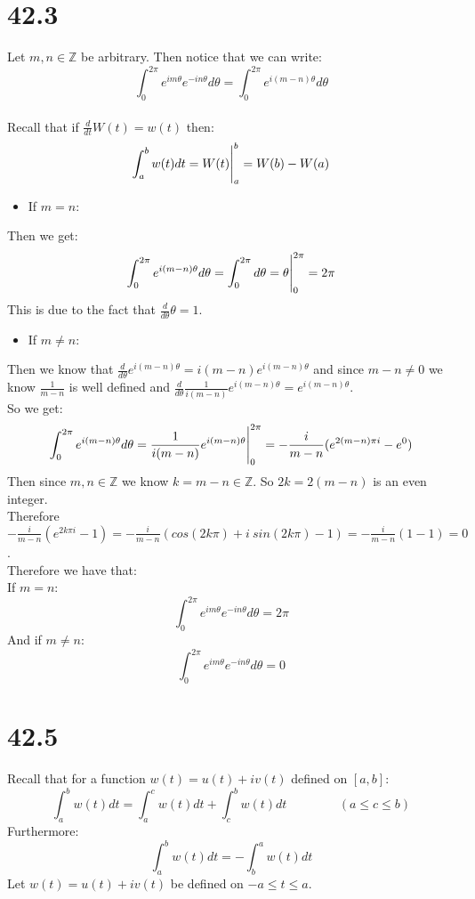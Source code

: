 \documentclass{article}
\begin{document}
\section*{42.3}
\begin{center}
    \doublespacing
    Let $m, n\in\mathbb{Z}$ be arbitrary. Then notice that we can write:
    \[\int _0^{2\pi} e^{im\theta} e^{-in\theta} d\theta =\int _0^{2\pi} e^{i(m-n)\theta} d\theta\]
    \\Recall that if $\frac{d}{dt} W(t) = w(t)$ then:
    \[\int _a^b w(t) dt = W(t)\Bigg{|}_a^b = W(b) - W(a)\]
\end{center}
\begin{itemize}
    \item If $m = n$:
\end{itemize}
\begin{center}
    \doublespacing
    Then we get:
    \[\int _0^{2\pi} e^{i(m-n)\theta} d\theta =\int _0^{2\pi} d\theta =\theta\Bigg{|}_0^{2\pi} = 2\pi\]
    This is due to the fact that $\frac{d}{d\theta}\theta = 1$.
\end{center}
\begin{itemize}
    \item If $m\neq n$:
\end{itemize}
\begin{center}
    \doublespacing
    Then we know that $\frac{d}{d\theta} e^{i(m-n)\theta} = i(m-n) e^{i(m-n)\theta}$ and since $m-n\neq 0$ we know $\frac{1}{m-n}$ is well defined and $\frac{d}{d\theta}\frac{1}{i(m-n)} e^{i(m-n)\theta} = e^{i(m-n)\theta}$.
    \\So we get:
    \[\int _0^{2\pi} e^{i(m-n)\theta} d\theta =\frac{1}{i(m-n)} e^{i(m-n)\theta}\Bigg{|}_0^{2\pi} = -\frac{i}{m-n} (e^{2(m-n)\pi i} - e^0)\]
    Then since $m, n\in\mathbb{Z}$ we know $k = m-n\in\mathbb{Z}$. So $2k = 2(m-n)$ is an even integer.
    \\Therefore $-\frac{i}{m-n} (e^{2k\pi i} - 1) = -\frac{i}{m-n} (cos(2k\pi) + i\:sin(2k\pi) - 1) = -\frac{i}{m-n} (1 - 1) = 0$.
    \break
    \\Therefore we have that:
    \\If $m = n$:
    \[\int _0^{2\pi} e^{im\theta} e^{-in\theta} d\theta = 2\pi\]
    And if $m\neq n$:
    \[\int _0^{2\pi} e^{im\theta} e^{-in\theta} d\theta = 0\]
    \qedsymbol
\end{center}


\newpage
\section*{42.5}
\begin{center}
    \doublespacing
    Recall that for a function $w(t) = u(t) + iv(t)$ defined on $[a, b]$:
    \[\int _a^b w(t) dt =\int _a^c w(t) dt +\int _c^b w(t) dt\;\;\;\;\;\;\;\;\;\;\;\;\;\;\;(a\leq c\leq b)\]
    Furthermore:
    \[\int _a^b w(t) dt = -\int _b^a w(t) dt\]
    Let $w(t) = u(t) + iv(t)$ be defined on $-a\leq t\leq a$.
\end{center}
\end{document}
